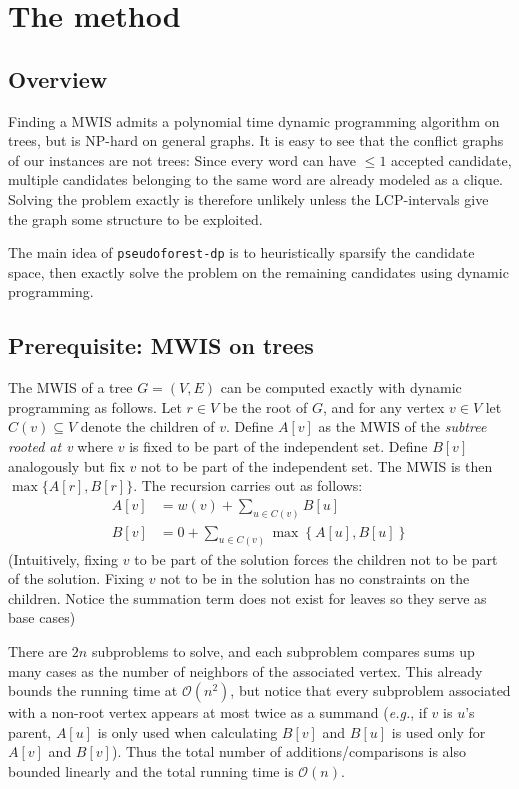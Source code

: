 \documentclass[11pt,a4paper]{article}
\begin{document}
\section{The method}

\subsection{Overview}

Finding a MWIS admits a polynomial time dynamic programming algorithm on trees, but is NP-hard on general graphs. It is easy to see that the conflict graphs of our instances are not trees: Since every word can have $\leq 1$ accepted candidate, multiple candidates belonging to the same word are already modeled as a clique. Solving the problem exactly is therefore unlikely unless the LCP-intervals give the graph some structure to be exploited.

The main idea of \texttt{pseudoforest-dp} is to heuristically sparsify the candidate space, then exactly solve the problem on the remaining candidates using dynamic programming.

\subsection{Prerequisite: MWIS on trees}

The MWIS of a tree $G = (V, E)$ can be computed exactly with dynamic programming as follows. Let $r \in V$ be the root of $G$, and for any vertex $v \in V$ let $C(v) \subseteq V$ denote the children of $v$. Define $A[v]$ as the MWIS of the \emph{subtree rooted at v} where $v$ is fixed to be part of the independent set. Define $B[v]$ analogously but fix $v$ not to be part of the independent set. The MWIS is then $\max \{A[r], B[r]\}$. The recursion carries out as follows:
\begin{align*}
    A[v] &= w(v)+ \sum_{u \in C(v)}B[u] \\
    B[v] &= 0 + \sum_{u \in C(v)}\max \left\{ A[u], B[u]\right\}
\end{align*}
(Intuitively, fixing $v$ to be part of the solution forces the children not to be part of the solution. Fixing $v$ not to be in the solution has no constraints on the children. Notice the summation term does not exist for leaves so they serve as base cases)

There are $2n$ subproblems to solve, and each subproblem compares sums up many cases as the number of neighbors of the associated vertex. This already bounds the running time at $\mathcal{O}(n^2)$, but notice that every subproblem associated with a non-root vertex appears at most twice as a summand (\emph{e.g.}, if $v$ is $u$'s parent, $A[u]$ is only used when calculating $B[v]$ and $B[u]$ is used only for $A[v]$ and $B[v]$). Thus the total number of additions/comparisons is also bounded linearly and the total running time is $\mathcal{O}(n)$.
\end{document}
